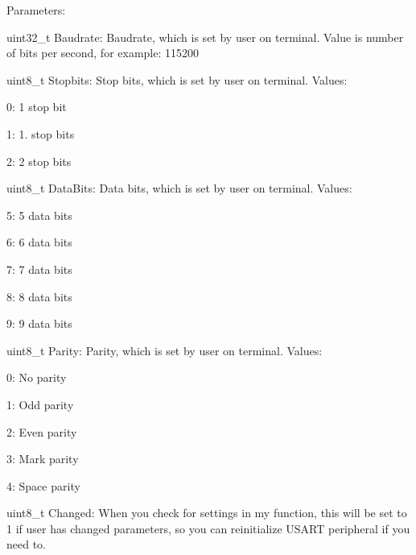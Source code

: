 Parameters\+:
\begin{DoxyItemize}
\item uint32\+\_\+t Baudrate\+: Baudrate, which is set by user on terminal. Value is number of bits per second, for example\+: 115200
\item uint8\+\_\+t Stopbits\+: Stop bits, which is set by user on terminal. Values\+:
\begin{DoxyItemize}
\item 0\+: 1 stop bit
\item 1\+: 1. stop bits
\item 2\+: 2 stop bits
\end{DoxyItemize}
\item uint8\+\_\+t Data\+Bits\+: Data bits, which is set by user on terminal. Values\+:
\begin{DoxyItemize}
\item 5\+: 5 data bits
\item 6\+: 6 data bits
\item 7\+: 7 data bits
\item 8\+: 8 data bits
\item 9\+: 9 data bits
\end{DoxyItemize}
\item uint8\+\_\+t Parity\+: Parity, which is set by user on terminal. Values\+:
\begin{DoxyItemize}
\item 0\+: No parity
\item 1\+: Odd parity
\item 2\+: Even parity
\item 3\+: Mark parity
\item 4\+: Space parity
\end{DoxyItemize}
\item uint8\+\_\+t Changed\+: When you check for settings in my function, this will be set to 1 if user has changed parameters, so you can reinitialize U\+S\+A\+R\+T peripheral if you need to. 
\end{DoxyItemize}